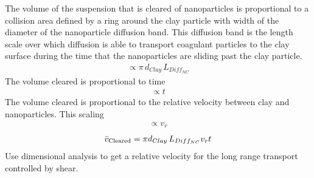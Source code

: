 \documentclass[letterpaper,10pt,english]{sphinxmanual}
\begin{document}
The volume of the suspension that is cleared of nanoparticles is proportional to a collision area defined by a ring around the clay particle with width of the diameter of the nanoparticle diffusion band. This diffusion band is the length scale over which diffusion is able to transport coagulant particles to the clay surface during the time that the nanoparticles are sliding past the clay particle.
\begin{equation}\label{equation:Rapid_Mix/RM_Theory_and_Future_Work:Rapid_Mix/RM_Theory_and_Future_Work:0}
\begin{split}\propto \pi \, d_{Clay} \, L_{Diff_{NC}}\end{split}
\end{equation}
The volume cleared is proportional to time
\begin{equation}\label{equation:Rapid_Mix/RM_Theory_and_Future_Work:Rapid_Mix/RM_Theory_and_Future_Work:1}
\begin{split}\propto t\end{split}
\end{equation}
The volume cleared is proportional to the relative velocity between clay and nanoparticles. This scaling
\begin{equation}\label{equation:Rapid_Mix/RM_Theory_and_Future_Work:Rapid_Mix/RM_Theory_and_Future_Work:2}
\begin{split}\propto v_r\end{split}
\end{equation}\begin{equation}\label{equation:Rapid_Mix/RM_Theory_and_Future_Work:Rapid_Mix/RM_Theory_and_Future_Work:3}
\begin{split}\bar v_{\rm{Cleared}} = \pi  d_{Clay} \, L_{Diff_{NC}}  v_r  t\end{split}
\end{equation}
Use dimensional analysis to get a relative velocity for the long range transport controlled by shear.
\end{document}
